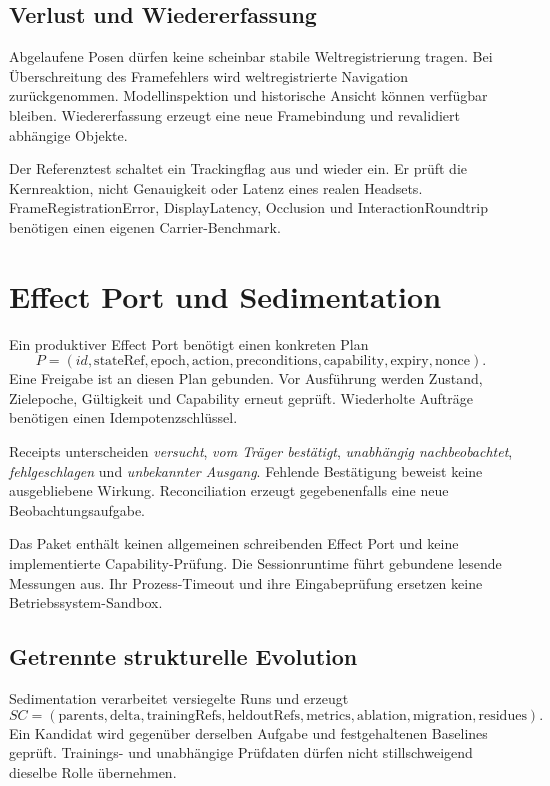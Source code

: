 \documentclass[11pt,a4paper]{article}
\newcommand{\nextsection}[2]{\clearpage{\color{accent}\small\textsf{#1}}\section{#2}}
\begin{document}
\subsection{Verlust und Wiedererfassung}
Abgelaufene Posen dürfen keine scheinbar stabile Weltregistrierung
tragen. Bei Überschreitung des Framefehlers wird weltregistrierte
Navigation zurückgenommen. Modellinspektion und historische
Ansicht können verfügbar bleiben. Wiedererfassung erzeugt
eine neue Framebindung und revalidiert abhängige Objekte.

Der Referenztest schaltet ein Trackingflag aus und wieder ein.
Er prüft die Kernreaktion, nicht Genauigkeit oder Latenz eines
realen Headsets. FrameRegistrationError, DisplayLatency,
Occlusion und InteractionRoundtrip benötigen einen eigenen
Carrier-Benchmark.

\nextsection{14 / WIRKUNG UND EVOLUTION}{Effect Port und Sedimentation}
Ein produktiver Effect Port benötigt einen konkreten Plan
\[
P=(id,\mathrm{stateRef},\mathrm{epoch},\mathrm{action},
\mathrm{preconditions},\mathrm{capability},\mathrm{expiry},\mathrm{nonce}).
\]
Eine Freigabe ist an diesen Plan gebunden. Vor Ausführung werden
Zustand, Zielepoche, Gültigkeit und Capability erneut geprüft.
Wiederholte Aufträge benötigen einen Idempotenzschlüssel.

Receipts unterscheiden \emph{versucht}, \emph{vom Träger bestätigt},
\emph{unabhängig nachbeobachtet}, \emph{fehlgeschlagen} und
\emph{unbekannter Ausgang}. Fehlende Bestätigung beweist keine
ausgebliebene Wirkung. Reconciliation erzeugt gegebenenfalls
eine neue Beobachtungsaufgabe.

Das Paket enthält keinen allgemeinen schreibenden Effect Port und
keine implementierte Capability-Prüfung. Die Sessionruntime führt
gebundene lesende Messungen aus. Ihr Prozess-Timeout und ihre
Eingabeprüfung ersetzen keine Betriebssystem-Sandbox.

\subsection{Getrennte strukturelle Evolution}
Sedimentation verarbeitet versiegelte Runs und erzeugt
\[
SC=(\mathrm{parents},\mathrm{delta},\mathrm{trainingRefs},
\mathrm{heldoutRefs},\mathrm{metrics},\mathrm{ablation},
\mathrm{migration},\mathrm{residues}).
\]
Ein Kandidat wird gegenüber derselben Aufgabe und festgehaltenen
Baselines geprüft. Trainings- und unabhängige Prüfdaten dürfen
nicht stillschweigend dieselbe Rolle übernehmen.
\end{document}
